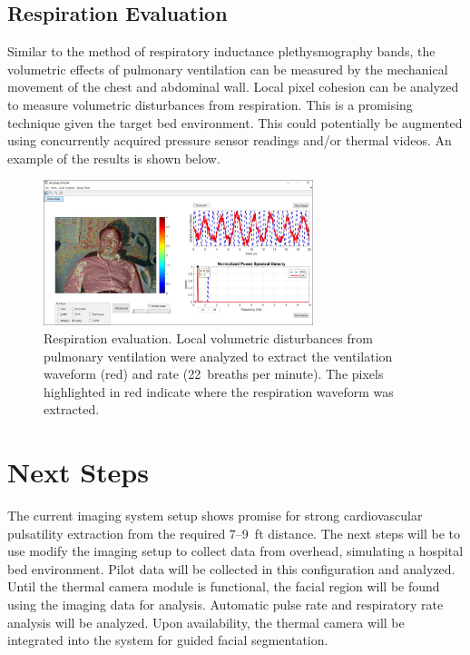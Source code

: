 \documentclass{article}
\begin{document}
\subsection{Respiration Evaluation}
Similar to the method of respiratory inductance plethysmography bands, the volumetric effects of pulmonary ventilation can be measured by the mechanical movement of the chest and abdominal wall. Local pixel cohesion can be analyzed to measure volumetric disturbances from respiration. This is a promising technique given the target bed environment. This could potentially be augmented using concurrently acquired pressure sensor readings and/or thermal videos. An example of the results is shown below.

\begin{figure}[H]
\centering
\includegraphics[width=0.7\textwidth]{respiration}
\caption{Respiration evaluation. Local volumetric disturbances from pulmonary ventilation were analyzed to extract the ventilation waveform (red) and rate (22~breaths per minute). The pixels highlighted in red indicate where the respiration waveform was extracted.}
\end{figure}


\section{Next Steps}
The current imaging system setup shows promise for strong cardiovascular pulsatility extraction from the required 7--9~ft distance. The next steps will be to use modify the imaging setup to collect data from overhead, simulating a hospital bed environment. Pilot data will be collected in this configuration and analyzed. Until the thermal camera module is functional, the facial region will be found using the imaging data for analysis. Automatic pulse rate and respiratory rate analysis will be analyzed. Upon availability, the thermal camera will be integrated into the system for guided facial segmentation.
\end{document}
